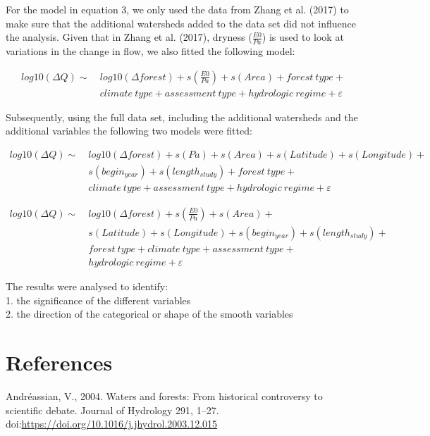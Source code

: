 \documentclass[]{elsarticle} %
\begin{document}
For the model in equation 3, we only used the data from Zhang et al.
(2017) to make sure that the additional watersheds added to the data set
did not influence the analysis. Given that in Zhang et al. (2017),
dryness (\(\frac{E0}{Pa}\)) is used to look at variations in the change
in flow, we also fitted the following model:

\[\tag{4}
\begin{aligned}
log10(\Delta Q) \sim ~&log10(\Delta forest) + s(\frac{E0}{Pa}) + s(Area) +  {forest~type} + \\  &{climate~type} + {assessment~type} + {hydrologic~regime} + \varepsilon
\end{aligned}\]

Subsequently, using the full data set, including the additional
watersheds and the additional variables the following two models were
fitted:

\[\tag{5}
\begin{aligned}
log10(\Delta Q) \sim ~&log10(\Delta forest) + s(Pa) + s(Area) + s(Latitude) + s(Longitude) + \\
& s(begin_{year}) + s(length_{study}) + {forest~type} + \\ & {climate~type} + {assessment~type} + {hydrologic~regime} + \varepsilon
\end{aligned}\]

\[\tag{6}
\begin{aligned}
log10(\Delta Q) \sim ~&log10(\Delta forest) + s(\frac{E0}{Pa}) + s(Area) + \\ 
& s(Latitude) + s(Longitude) + s(begin_{year}) + s(length_{study}) + \\ 
& {forest~type} + {climate~type} + {assessment~type} + \\  
& {hydrologic~regime} + \varepsilon
\end{aligned}\]

The results were analysed to identify:\\
1. the significance of the different variables\\
2. the direction of the categorical or shape of the smooth variables

\hypertarget{references}{%
\section*{References}\label{references}}

\hypertarget{refs}{}
\leavevmode\hypertarget{ref-andreassian2004}{}%
Andréassian, V., 2004. Waters and forests: From historical controversy
to scientific debate. Journal of Hydrology 291, 1--27.
doi:\href{https://doi.org/https://doi.org/10.1016/j.jhydrol.2003.12.015}{https://doi.org/10.1016/j.jhydrol.2003.12.015}
\end{document}
